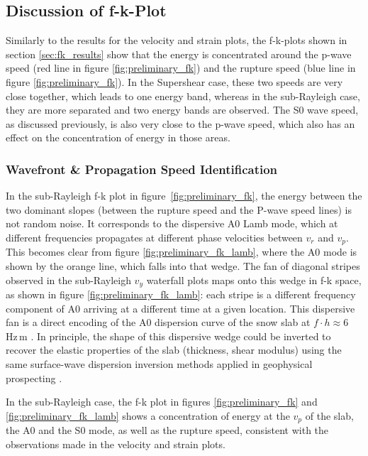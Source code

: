 \subsection{Discussion of f-k-Plot}

Similarly to the results for the velocity and strain plots, the f-k-plots shown in section \ref{sec:fk_results} show that the energy is concentrated around the p-wave speed (red line in figure \ref{fig:preliminary_fk}) and the rupture speed (blue line in figure \ref{fig:preliminary_fk}). In the Supershear case, these two speeds are very close together, which leads to one energy band, whereas in the sub-Rayleigh case, they are more separated and two energy bands are observed. The S0 wave speed, as discussed previously, is also very close to the p-wave speed, which also has an effect on the concentration of energy in those areas. \par

\subsubsection{Wavefront \& Propagation Speed Identification}
In the sub-Rayleigh f-k plot in figure~\ref{fig:preliminary_fk}, the energy
between the two dominant slopes (between the rupture speed and the P-wave speed lines) is not random noise. It corresponds to the dispersive
A0 Lamb mode, which at different frequencies propagates at different phase
velocities between \(v_r\) and \(v_p\). This becomes clear from figure \ref{fig:preliminary_fk_lamb}, where the A0 mode is shown by the orange line, which falls into that wedge. The fan of diagonal stripes observed in the sub-Rayleigh \(v_y\) waterfall plots maps onto this wedge in f-k space, as shown in figure \ref{fig:preliminary_fk_lamb}: each stripe is a different frequency component of A0 arriving at a different time at a given location. This dispersive fan is a direct encoding of the A0 dispersion curve of the snow slab at \(f \cdot h \approx 6\) Hz\,m \parencite{roseWavesPlates2014, lambWavesElasticPlate1917}. In principle, the shape of this dispersive wedge could be inverted to recover the elastic properties of the slab (thickness, shear modulus) using the same surface-wave dispersion
inversion methods applied in geophysical prospecting \parencite{yilmazSeismicDataAnalysis2001}. \par

In the sub-Rayleigh case, the f-k plot in figures \ref{fig:preliminary_fk} and \ref{fig:preliminary_fk_lamb} shows a concentration of energy at the \(v_p\) of the slab, the A0 and the S0 mode, as well as the rupture speed, consistent with the observations made in the velocity and strain plots. \par

